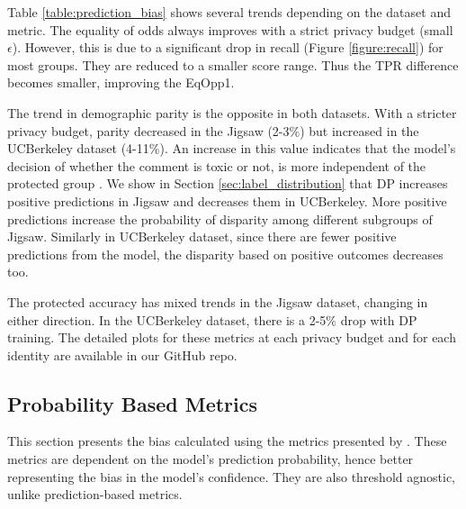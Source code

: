 \documentclass[11pt]{article} %
\begin{document}
Table \ref{table:prediction_bias} shows several trends depending on the dataset and metric. The equality of odds always improves with a strict privacy budget (small $\epsilon$). However, this is due to a significant drop in recall (Figure \ref{figure:recall}) for most groups. They are reduced to a smaller score range. Thus the TPR difference becomes smaller, improving the EqOpp1. 

The trend in demographic parity is the opposite in both datasets. With a stricter privacy budget, parity decreased in the Jigsaw (2-3\%) but increased in the UCBerkeley dataset (4-11\%). An increase in this value indicates that the model's decision of whether the comment is toxic or not, is more independent of the protected group \cite{hardt2016equality}. We show in Section \ref{sec:label_distribution} that DP increases positive predictions in Jigsaw and decreases them in UCBerkeley. More positive predictions increase the probability of disparity among different subgroups of Jigsaw. Similarly in UCBerkeley dataset, since there are fewer positive predictions from the model, the disparity based on positive outcomes decreases too. 

The protected accuracy has mixed trends in the Jigsaw dataset, changing in either direction. In the UCBerkeley dataset, there is a 2-5\% drop with DP training. The detailed plots for these metrics at each privacy budget and for each identity are available in our GitHub repo.

\subsection{Probability Based Metrics \label{sec:probability_based_bias}}
This section presents the bias calculated using the metrics presented by \cite{borkan2019nuanced}. These metrics are dependent on the model's prediction probability, hence better representing the bias in the model's confidence. They are also threshold agnostic, unlike prediction-based metrics.
\end{document}
